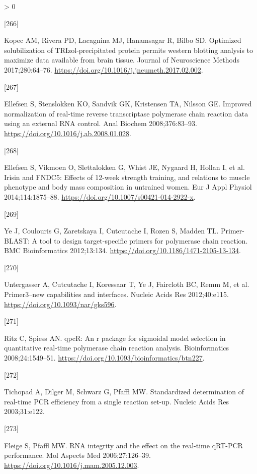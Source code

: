 \documentclass[twoside,10pt]{gihclass} %
\newlength{\cslhangindent}
\newlength{\csllabelwidth}
\newenvironment{CSLReferences}[3] %
 {%
  \setlength{\parindent}{0pt}
  \ifodd #1 \everypar{\setlength{\hangindent}{\cslhangindent}}\ignorespaces\fi
  \ifnum #2 > 0
  \setlength{\parskip}{#2\baselineskip}
  \fi
 }%
 {}
\newcommand{\CSLLeftMargin}[1]{\parbox[t]{\maxof{\widthof{#1}}{\csllabelwidth}}{#1}}
\newcommand{\CSLRightInline}[1]{\parbox[t]{\linewidth}{#1}}
\begin{document}
\begin{CSLReferences}{0}{0}
\leavevmode\hypertarget{ref-RN2050}{}%
\CSLLeftMargin{{[}266{]} }
\CSLRightInline{Kopec AM, Rivera PD, Lacagnina MJ, Hanamsagar R, Bilbo SD. Optimized solubilization of TRIzol-precipitated protein permits western blotting analysis to maximize data available from brain tissue. Journal of Neuroscience Methods 2017;280:64--76. \url{https://doi.org/10.1016/j.jneumeth.2017.02.002}.}

\leavevmode\hypertarget{ref-RN1162}{}%
\CSLLeftMargin{{[}267{]} }
\CSLRightInline{Ellefsen S, Stenslokken KO, Sandvik GK, Kristensen TA, Nilsson GE. Improved normalization of real-time reverse transcriptase polymerase chain reaction data using an external RNA control. Anal Biochem 2008;376:83--93. \url{https://doi.org/10.1016/j.ab.2008.01.028}.}

\leavevmode\hypertarget{ref-RN1512}{}%
\CSLLeftMargin{{[}268{]} }
\CSLRightInline{Ellefsen S, Vikmoen O, Slettalokken G, Whist JE, Nygaard H, Hollan I, et al. Irisin and FNDC5: Effects of 12-week strength training, and relations to muscle phenotype and body mass composition in untrained women. Eur J Appl Physiol 2014;114:1875--88. \url{https://doi.org/10.1007/s00421-014-2922-x}.}

\leavevmode\hypertarget{ref-RN1815}{}%
\CSLLeftMargin{{[}269{]} }
\CSLRightInline{Ye J, Coulouris G, Zaretskaya I, Cutcutache I, Rozen S, Madden TL. Primer-BLAST: A tool to design target-specific primers for polymerase chain reaction. BMC Bioinformatics 2012;13:134. \url{https://doi.org/10.1186/1471-2105-13-134}.}

\leavevmode\hypertarget{ref-RN1816}{}%
\CSLLeftMargin{{[}270{]} }
\CSLRightInline{Untergasser A, Cutcutache I, Koressaar T, Ye J, Faircloth BC, Remm M, et al. Primer3--new capabilities and interfaces. Nucleic Acids Res 2012;40:e115. \url{https://doi.org/10.1093/nar/gks596}.}

\leavevmode\hypertarget{ref-RN1768}{}%
\CSLLeftMargin{{[}271{]} }
\CSLRightInline{Ritz C, Spiess AN. qpcR: An r package for sigmoidal model selection in quantitative real-time polymerase chain reaction analysis. Bioinformatics 2008;24:1549--51. \url{https://doi.org/10.1093/bioinformatics/btn227}.}

\leavevmode\hypertarget{ref-RN1934}{}%
\CSLLeftMargin{{[}272{]} }
\CSLRightInline{Tichopad A, Dilger M, Schwarz G, Pfaffl MW. Standardized determination of real-time PCR efficiency from a single reaction set-up. Nucleic Acids Res 2003;31:e122.}

\leavevmode\hypertarget{ref-RN2248}{}%
\CSLLeftMargin{{[}273{]} }
\CSLRightInline{Fleige S, Pfaffl MW. RNA integrity and the effect on the real-time qRT-PCR performance. Mol Aspects Med 2006;27:126--39. \url{https://doi.org/10.1016/j.mam.2005.12.003}.}


\end{CSLReferences}
\end{document}
